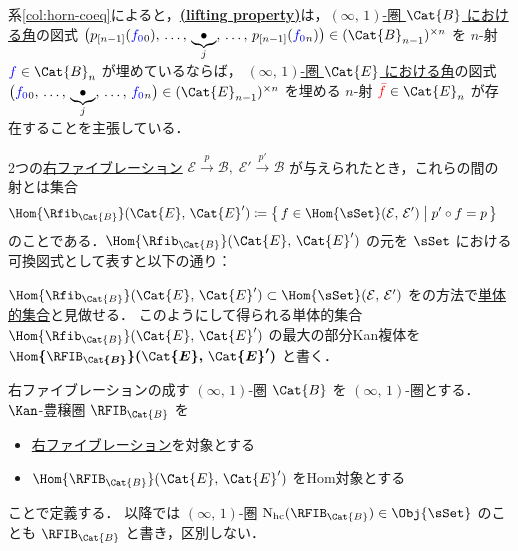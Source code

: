 \documentclass[TQFT_main]{subfiles}
\begin{document}
系\ref{col:horn-coeq}によると，\hyperref[def:infty-fib]{\textsf{\textbf{(lifting property)}}}は，\underline{$(\infty,\, 1)$-圏 $\Cat{B}$ における}\hyperref[def:horn]{角}の図式
$\bigl(p_{[n-1]}(\textcolor{blue}{f_0}{}_0),\, \dots,\, \underbrace{\bullet}_{j},\, \dots,\, p_{[n-1]}(\textcolor{blue}{f_0}{}_n)\bigr) \in (\Cat{B}_{n-1})^{\times n}$ を $n$-射 $\textcolor{blue}{f} \in \Cat{B}_n$ が埋めているならば，
\underline{$(\infty,\, 1)$-圏 $\Cat{E}$ における}\hyperref[def:horn]{角}の図式
$\bigl(\textcolor{blue}{f_{0}}{}_0,\, \dots,\, \underbrace{\bullet}_{j},\, \dots,\, \textcolor{blue}{f_0}{}_n\bigr) \in (\Cat{E}_{n-1})^{\times n}$ を埋める $n$-射 $\textcolor{red}{\bar{f}} \in \Cat{E}_n$ が存在することを主張している．

2つの\hyperref[def:infty-fib]{右ファイブレーション} $\mathcal{E} \xrightarrow{p} \mathcal{B},\; \mathcal{E}' \xrightarrow{p'} \mathcal{B}$ が与えられたとき，これらの間の射とは集合
\begin{align}
    \Hom{\Rfib_{\Cat{B}}} (\Cat{E},\, \Cat{E}') &\coloneqq 
    \bigl\{\, f \in \Hom{\sSet}(\mathcal{E},\, \mathcal{E}') \bigm| p' \circ f = p \,\bigr\}
\end{align}
のことである．$\Hom{\Rfib_{\Cat{B}}} (\Cat{E},\, \Cat{E}')$ の元を $\sSet$ における可換図式として表すと以下の通り：
\begin{center}
\end{center}
$\Hom{\Rfib_{\Cat{B}}} (\Cat{E},\, \Cat{E}') \subset \Hom{\sSet}(\mathcal{E},\, \mathcal{E}')$ をの方法で\hyperref[def:SimpSet]{単体的集合}と見做せる．
このようにして得られる単体的集合 $\Hom{\Rfib_{\Cat{B}}} (\Cat{E},\, \Cat{E}')$ の最大の部分Kan複体を $\bm{\Hom{\RFIB_{\Cat{B}}}(\Cat{E},\, \Cat{E}')}$ と書く．

\begin{mydef}[label=def:RFIB]{右ファイブレーションの成す {$(\infty,\, 1)$}-圏}
    $\Cat{B}$ を $(\infty,\, 1)$-圏とする．
    $\Kan$-豊穣圏 $\RFIB_{\Cat{B}}$ を
    \begin{itemize}
        \item \hyperref[def:infty-fib]{右ファイブレーション}を対象とする
        \item $\Hom{\RFIB_{\Cat{B}}}(\Cat{E},\, \Cat{E}')$ をHom対象とする
    \end{itemize}
    ことで定義する．
    以降では $(\infty,\, 1)$-圏 $\mathrm{N}_{\text{hc}}(\RFIB_{\Cat{B}}) \in \Obj{\sSet}$ のことも $\RFIB_{\Cat{B}}$ と書き，区別しない．
\end{mydef}
\end{document}
